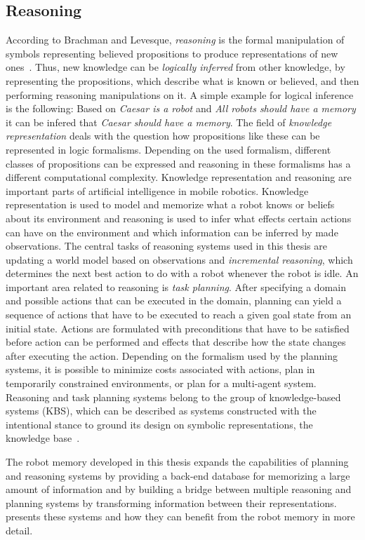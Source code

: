 \subsection{Reasoning}
\label{sec:reasoning}
According to Brachman and Levesque, \emph{reasoning} is the formal
manipulation of symbols representing believed propositions to produce
representations of new ones~\cite{kr-book}. Thus, new knowledge can be
\emph{logically inferred} from other knowledge, by representing the
propositions, which describe what is known or believed, and then
performing reasoning manipulations on it.  A simple example for
logical inference is the following: Based on \emph{Caesar is a robot}
and \emph{All robots should have a memory} it can be infered that
\emph{Caesar should have a memory}.  The field of \emph{knowledge
  representation} deals with the question how propositions like these
can be represented in logic formalisms.  Depending on the used
formalism, different classes of propositions can be expressed and
reasoning in these formalisms has a different computational
complexity. Knowledge representation and reasoning are important parts
of artificial intelligence in mobile robotics. Knowledge
representation is used to model and memorize what a robot knows or
beliefs about its environment and reasoning is used to infer what
effects certain actions can have on the environment and which
information can be inferred by made observations. The central tasks of
reasoning systems used in this thesis are updating a world model based
on observations and \emph{incremental reasoning}, which determines the
next best action to do with a robot whenever the robot is idle. An
important area related to reasoning is \emph{task planning}. After
specifying a domain and possible actions that can be executed in the
domain, planning can yield a sequence of actions that have to be
executed to reach a given goal state from an initial state. Actions
are formulated with preconditions that have to be satisfied before
action can be performed and effects that describe how the state
changes after executing the action. Depending on the formalism used by
the planning systems, it is possible to minimize costs associated with
actions, plan in temporarily constrained environments, or plan for a
multi-agent system. Reasoning and task planning systems belong to the
group of knowledge-based systems (KBS), which can be described as
systems constructed with the intentional stance to ground its design
on symbolic representations, the knowledge base~\cite{kr-book}.

The robot memory developed in this thesis expands the capabilities of
planning and reasoning systems by providing a back-end database for
memorizing a large amount of information and by building a bridge
between multiple reasoning and planning systems by transforming
information between their representations. 
presents these systems and how they can benefit from the robot memory
in more detail.
  
